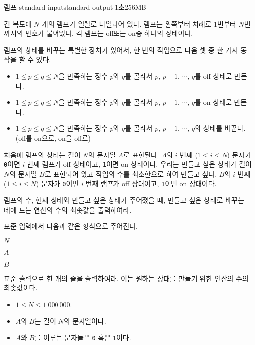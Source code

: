 \begin{problem}{램프}
	{standard input}{standard output}
	{1초}{256MB}{}
	
	긴 복도에 $N$ 개의 램프가 일렬로 나열되어 있다. 램프는 왼쪽부터 차례로 1번부터 $N$번까지의 번호가 붙어있다. 각 램프는 off또는 on중 하나의 상태이다.
	
	램프의 상태를 바꾸는 특별한 장치가 있어서, 한 번의 작업으로 다음 셋 중 한 가지 동작을 할 수 있다.
	
	\begin{itemize}
		\item $1 \le p \le q \le N$을 만족하는 정수 $p$와 $q$를 골라서 $p$, $p+1$, $\cdots$, $q$를 off 상태로 만든다.
		\item $1 \le p \le q \le N$을 만족하는 정수 $p$와 $q$를 골라서 $p$, $p+1$, $\cdots$, $q$를 on 상태로 만든다.
		\item $1 \le p \le q \le N$을 만족하는 정수 $p$와 $q$를 골라서 $p$, $p+1$, $\cdots$, $q$의 상태를 바꾼다. (off를 on으로, on을 off로)
	\end{itemize} 

	처음에 램프의 상태는 길이 $N$의 문자열 $A$로 표현된다. $A$의 $i$ 번째 ($1 \le i \le N$) 문자가 \texttt{0}이면 $i$ 번째 램프가 off 상태이고, \texttt{1}이면 on 상태이다. 우리는 만들고 싶은 상태가 길이 $N$의 문자열 $B$로 표현되어 있고 작업의 수를 최소한으로 하여 만들고 싶다. $B$의 $i$ 번째 ($1 \le i \le N$) 문자가 \texttt{0}이면 $i$ 번째 램프가 off 상태이고, \texttt{1}이면 on 상태이다. 
	
	램프의 수, 현재 상태와 만들고 싶은 상태가 주어졌을 때, 만들고 싶은 상태로 바꾸는 데에 드는 연산의 수의 최솟값을 출력하여라.

	\InputFile
	
	표준 입력에서 다음과 같은 형식으로 주어진다.
	
	$N$

	$A$

	$B$
	
	
	\OutputFile
	
	표준 출력으로 한 개의 줄을 출력하여라. 이는 원하는 상태를 만들기 위한 연산의 수의 최솟값이다.
		
	\Constraints
	
	\begin{itemize}
		\item $1 \le N \le 1\ 000\ 000$.
		\item $A$와 $B$는 길이 $N$의 문자열이다.
		\item $A$와 $B$를 이루는 문자들은 \texttt{0} 혹은 \texttt{1}이다.
	\end{itemize}
	

\end{problem}
